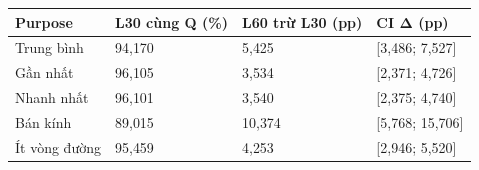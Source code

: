 \par\smallskip\noindent\begin{tabularx}{\linewidth}{@{}P{3.3cm}XXX@{}}\toprule
\textbf{Purpose} & \textbf{L30 cùng Q (\%)} & \textbf{L60 trừ L30 (pp)} & \textbf{CI Δ (pp)} \\
\midrule
Trung bình & 94{,}170 & 5{,}425 & [3{,}486; 7{,}527] \\
Gần nhất & 96{,}105 & 3{,}534 & [2{,}371; 4{,}726] \\
Nhanh nhất & 96{,}101 & 3{,}540 & [2{,}375; 4{,}740] \\
Bán kính & 89{,}015 & 10{,}374 & [5{,}768; 15{,}706] \\
Ít vòng đường & 95{,}459 & 4{,}253 & [2{,}946; 5{,}520] \\
\bottomrule\end{tabularx}\par\smallskip
